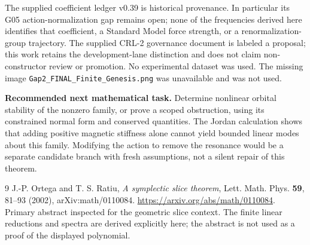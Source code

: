 \documentclass[11pt,a4paper]{article}
\begin{document}
The supplied coefficient ledger v0.39 is historical provenance. In particular its G05 action-normalization gap remains open; none of the frequencies derived here identifies that coefficient, a Standard Model force strength, or a renormalization-group trajectory. The supplied CRL-2 governance document is labeled a proposal; this work retains the development-lane distinction and does not claim non-constructor review or promotion. No experimental dataset was used. The missing image \texttt{Gap2\_FINAL\_Finite\_Genesis.png} was unavailable and was not used.

\textbf{Recommended next mathematical task.} Determine nonlinear orbital stability of the nonzero family, or prove a scoped obstruction, using its constrained normal form and conserved quantities. The Jordan calculation shows that adding positive magnetic stiffness alone cannot yield bounded linear modes about this family. Modifying the action to remove the resonance would be a separate candidate branch with fresh assumptions, not a silent repair of this theorem.

\begin{thebibliography}{9}
 J.-P. Ortega and T. S. Ratiu, \emph{A symplectic slice theorem}, Lett. Math. Phys. \textbf{59}, 81--93 (2002), arXiv:math/0110084. \url{https://arxiv.org/abs/math/0110084}. Primary abstract inspected for the geometric slice context. The finite linear reductions and spectra are derived explicitly here; the abstract is not used as a proof of the displayed polynomial.
\end{thebibliography}
\end{document}
